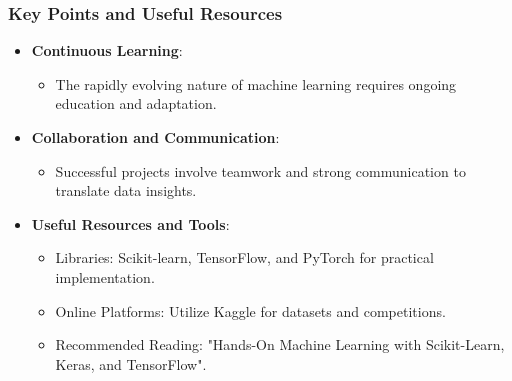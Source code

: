 \documentclass[aspectratio=169]{beamer}
\begin{document}
\begin{frame}[fragile]
    \frametitle{Key Points and Useful Resources}
    \begin{itemize}
        \item \textbf{Continuous Learning}:
        \begin{itemize}
            \item The rapidly evolving nature of machine learning requires ongoing education and adaptation.
        \end{itemize}

        \item \textbf{Collaboration and Communication}:
        \begin{itemize}
            \item Successful projects involve teamwork and strong communication to translate data insights.
        \end{itemize}

        \item \textbf{Useful Resources and Tools}:
        \begin{itemize}
            \item Libraries: Scikit-learn, TensorFlow, and PyTorch for practical implementation.
            \item Online Platforms: Utilize Kaggle for datasets and competitions.
            \item Recommended Reading: "Hands-On Machine Learning with Scikit-Learn, Keras, and TensorFlow".
        \end{itemize}
    \end{itemize}
\end{frame}
\end{document}
